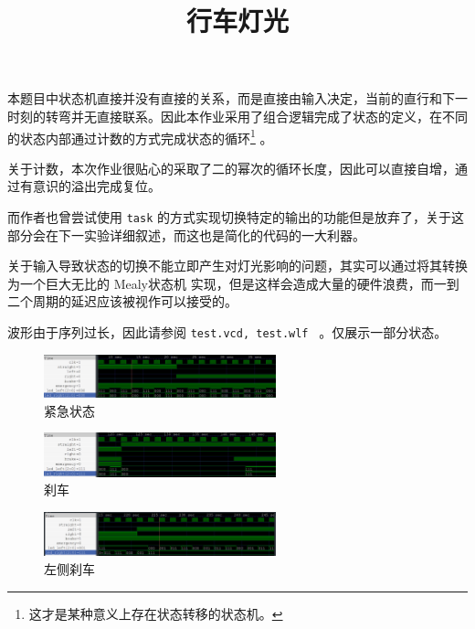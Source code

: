\documentclass[lang=cn]{elegantpaper}
\title{行车灯光}
\begin{document}
\maketitle

本题目中状态机直接并没有直接的关系，而是直接由输入决定，当前的直行和下一时刻的转弯并无直接联系。因此本作业采用了组合逻辑完成了状态的定义，在不同的状态内部通过计数的方式完成状态的循环\footnote{这才是某种意义上存在状态转移的状态机。} 。

关于计数，本次作业很贴心的采取了二的幂次的循环长度，因此可以直接自增，通过有意识的溢出完成复位。

而作者也曾尝试使用 \lstinline{task} 的方式实现切换特定的输出的功能但是放弃了，关于这部分会在下一实验详细叙述，而这也是简化的代码的一大利器。

关于输入导致状态的切换不能立即产生对灯光影响的问题，其实可以通过将其转换为一个巨大无比的 Mealy状态机 实现，但是这样会造成大量的硬件浪费，而一到二个周期的延迟应该被视作可以接受的。

波形由于序列过长，因此请参阅 \lstinline{test.vcd, test.wlf } 。仅展示一部分状态。


\begin{figure}[htb]
    \centering
    \caption{紧急状态}\label{01}
    \includegraphics[width=0.6\textwidth]{eme.png}
\end{figure}


\begin{figure}[htb]
    \centering
    \caption{刹车}\label{02}
    \includegraphics[width=0.6\textwidth]{brake.png}
\end{figure}


\begin{figure}[htb]
    \centering
    \caption{左侧刹车}\label{03}
    \includegraphics[width=0.6\textwidth]{leftb.png}
\end{figure}
\end{document}

